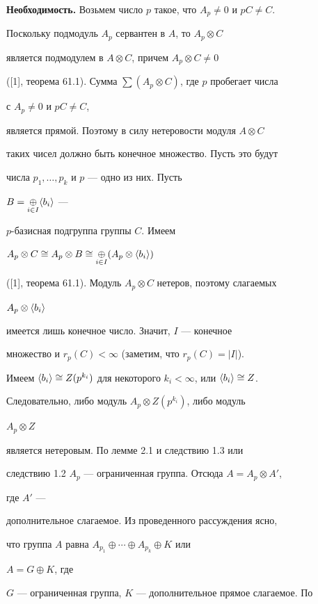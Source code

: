 \begin{pf} 


{\bf Необходимость.} Возьмем число $p$ такое, что $A_p\ne0$ и $p C\ne C$. 


Поскольку подмодуль $A_p$ сервантен в $A$, то $A_p\otimes C$ 


является подмодулем в $A\otimes C$, причем $A_p\otimes C\ne0$ 


([1], теорема 61.1). Сумма $\sum(A_p\otimes C)$, где $p$ пробегает числа 


с $A_p\ne0$ и $p C\ne C$, 


является прямой. Поэтому в силу нетеровости модуля $A\otimes C$ 


таких чисел должно быть конечное множество. Пусть это будут 


числа $p_1,\dotsc,p_k$ и $p$ --- одно из них. Пусть 


$B=\mathop{\oplus}\limits_{i\in I}\langle b_i\rangle$ --- 


$p$-базисная подгруппа группы $C$. Имеем 


$A_p\otimes C\cong A_p\otimes B\cong \mathop{\oplus}\limits_{i\in I} 


(A_p\otimes\la b_i\ra)$ 


([1], теорема 61.1). Модуль $A_p\otimes C$ нетеров, поэтому слагаемых 


$A_p\otimes\langle b_i\rangle$ 


имеется лишь конечное число. Значит, $I$ --- конечное 


множество и $r_p(C)<\infty$ (заметим, что $r_p(C)=|I|$). 


Имеем $\la b_i\ra\cong Z(p^{k_i})$ для некоторого $k_i<\infty$, или $\la 


b_i\ra\cong Z$. 


Следовательно, либо модуль $A_p\otimes Z(p^{k_i})$, либо модуль 


$A_p\otimes Z$ 


является нетеровым. По лемме 2.1 и следствию 1.3 или 


следствию 1.2\; $A_p$ --- ограниченная группа. Отсюда $A=A_p\otimes A'$, 


где $A'$ --- 


дополнительное слагаемое. Из проведенного рассуждения ясно, 


что группа $A$ равна $A_{p_1}\oplus\dotsb\oplus A_{p_k}\oplus K$ или 


$A=G\oplus K$, где 


$G$ --- ограниченная группа, $K$ --- дополнительное прямое слагаемое. По 



\end{pf}
